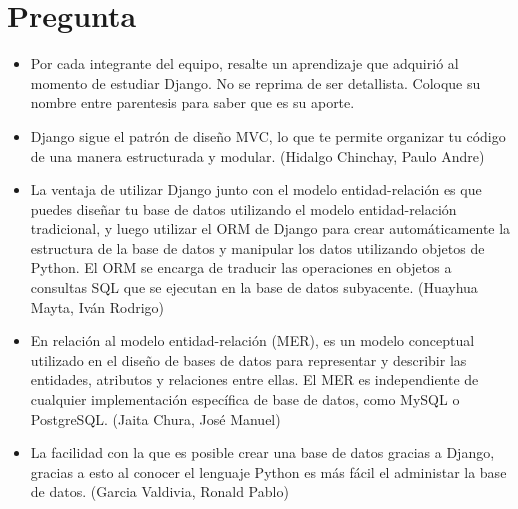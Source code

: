 \documentclass{article}
\begin{document}
    \section{Pregunta}
    \begin{itemize}
        \item Por cada integrante del equipo, resalte un aprendizaje que adquirió al momento de estudiar
        Django. No se reprima de ser detallista. Coloque su nombre entre parentesis para saber que es
        su aporte.
        \item Django sigue el patrón de diseño MVC, lo que te permite organizar tu código de una manera estructurada y modular. (Hidalgo Chinchay, Paulo Andre)
        \item La ventaja de utilizar Django junto con el modelo entidad-relación es que puedes diseñar tu base de datos utilizando el modelo entidad-relación tradicional, y luego utilizar el ORM de Django para crear automáticamente la estructura de la base de datos y manipular los datos utilizando objetos de Python. El ORM se encarga de traducir las operaciones en objetos a consultas SQL que se ejecutan en la base de datos subyacente. (Huayhua Mayta, Iván Rodrigo) 
        \item En relación al modelo entidad-relación (MER), es un modelo conceptual utilizado en el diseño de bases de datos para representar y describir las entidades, atributos y relaciones entre ellas. El MER es independiente de cualquier implementación específica de base de datos, como MySQL o PostgreSQL. (Jaita Chura, José Manuel)
        \item La facilidad con la que es posible crear una base de datos gracias a Django, gracias a esto al conocer el lenguaje Python es más fácil el administar la base de datos. (Garcia Valdivia, Ronald Pablo)
    \end{itemize}
    
\end{document}
